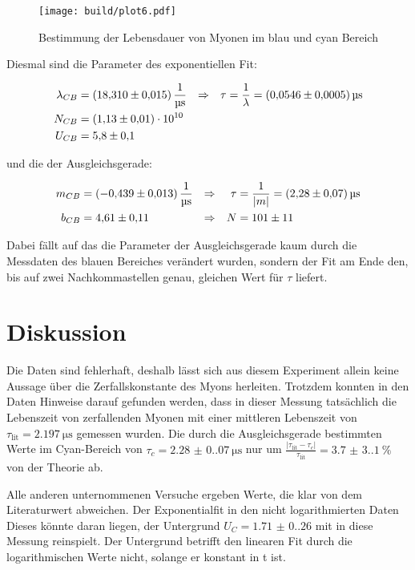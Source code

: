 \begin{figure}[H]
	\centering
	\texttt{[image: build/plot6.pdf]}
	\caption{Bestimmung der Lebensdauer von Myonen im blau und cyan Bereich}\label{fig:plt6}
\end{figure}

\newpage
Diesmal sind die Parameter des exponentiellen Fit:

\begin{align}
	\lambda_{CB}&=\qty{18.31(0.015)}{\per\us} &\Rightarrow & & \tau&=\frac{1}{\lambda }=\qty{0.0546(0.0005)}{\us} \\ 
	N_{CB}&=\num{1.13(0.1)e10} \notag \\
	U_{CB}&=\num{5.8(1)} \notag
\end{align}

und die der Ausgleichsgerade:

\begin{align}
	m_{CB}&=\qty{-0.439(0.013)}{\per\us} &\Rightarrow & & \tau&=\frac{1}{|m|}=\qty{2.28(0.07)}{\us} \\ \label{eq:good_tau}
	b_{CB}&=\num{4.61(0.11)} &\Rightarrow & & N&=\num{101(11)} \notag
\end{align}

Dabei fällt auf das die Parameter der Ausgleichsgerade kaum durch die Messdaten des blauen Bereiches verändert wurden, 
sondern der Fit am Ende den, bis auf zwei Nachkommastellen genau, gleichen Wert für $\tau $ liefert. 

\newpage
\section{Diskussion}
Die Daten sind fehlerhaft, deshalb lässt sich aus diesem Experiment allein keine Aussage über die Zerfallskonstante des
Myons herleiten. Trotzdem konnten in den Daten Hinweise darauf gefunden werden, dass in dieser Messung tatsächlich 
die Lebenszeit von zerfallenden Myonen mit einer mittleren Lebenszeit von $\tau_\text{lit} = \qty{2.197}{\micro\s}$\cite{Workman:2022ynf}
gemessen wurden.
Die durch die Ausgleichsgerade bestimmten Werte im Cyan-Bereich von $\tau_c= \qty{2.28(0.07)}{\us}$ nur um 
$\frac{|\tau_\text{lit} - \tau_c|}{\tau_\text{lit}} = \qty{3.7(3.1)}{\percent}$  von der Theorie ab. 

Alle anderen unternommenen Versuche ergeben Werte, die klar von dem Literaturwert abweichen.
Der Exponentialfit in den nicht logarithmierten Daten 
Dieses könnte daran liegen, der Untergrund $U_C=\num{1.71(0.26)}$ mit in diese Messung reinspielt.
Der Untergrund betrifft den linearen Fit durch die logarithmischen Werte nicht, solange er konstant in t ist.

